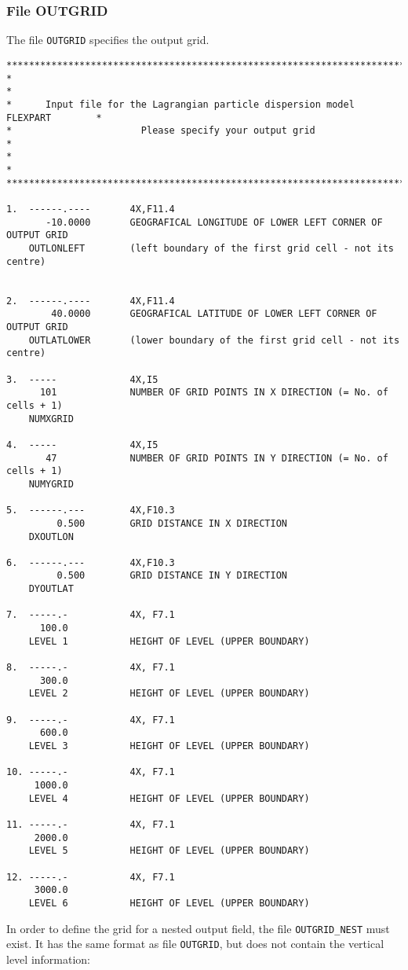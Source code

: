 \documentclass{egu}            %
\begin{document}
\subsubsection{File OUTGRID}
The file \verb|OUTGRID| specifies the output grid.
\begin{scriptsize}\begin{verbatim}
********************************************************************************
*                                                                              *
*      Input file for the Lagrangian particle dispersion model FLEXPART        *
*                       Please specify your output grid                        *
*                                                                              *
********************************************************************************

1.  ------.----       4X,F11.4
       -10.0000       GEOGRAFICAL LONGITUDE OF LOWER LEFT CORNER OF OUTPUT GRID
    OUTLONLEFT        (left boundary of the first grid cell - not its centre)


2.  ------.----       4X,F11.4
        40.0000       GEOGRAFICAL LATITUDE OF LOWER LEFT CORNER OF OUTPUT GRID
    OUTLATLOWER       (lower boundary of the first grid cell - not its centre)

3.  -----             4X,I5
      101             NUMBER OF GRID POINTS IN X DIRECTION (= No. of cells + 1)
    NUMXGRID

4.  -----             4X,I5
       47             NUMBER OF GRID POINTS IN Y DIRECTION (= No. of cells + 1)
    NUMYGRID

5.  ------.---        4X,F10.3
         0.500        GRID DISTANCE IN X DIRECTION
    DXOUTLON

6.  ------.---        4X,F10.3
         0.500        GRID DISTANCE IN Y DIRECTION
    DYOUTLAT

7.  -----.-           4X, F7.1
      100.0
    LEVEL 1           HEIGHT OF LEVEL (UPPER BOUNDARY)

8.  -----.-           4X, F7.1
      300.0
    LEVEL 2           HEIGHT OF LEVEL (UPPER BOUNDARY)

9.  -----.-           4X, F7.1
      600.0
    LEVEL 3           HEIGHT OF LEVEL (UPPER BOUNDARY)

10. -----.-           4X, F7.1
     1000.0
    LEVEL 4           HEIGHT OF LEVEL (UPPER BOUNDARY)

11. -----.-           4X, F7.1
     2000.0
    LEVEL 5           HEIGHT OF LEVEL (UPPER BOUNDARY)

12. -----.-           4X, F7.1
     3000.0
    LEVEL 6           HEIGHT OF LEVEL (UPPER BOUNDARY)
\end{verbatim}\end{scriptsize}
In order to define the grid for a nested output field, the file
\verb|OUTGRID_NEST| must exist.  It has the same format as file \verb|OUTGRID|,
but does not contain the vertical level information:
\end{document}
